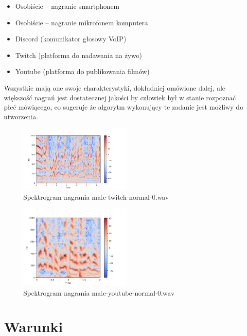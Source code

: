 \documentclass[a4paper,12pt]{extarticle}
\begin{document}
\begin{itemize}
    \item Osobiście – nagranie smartphonem
    \item Osobiście – nagranie mikrofonem komputera
    \item Discord (komunikator głosowy VoIP)
    \item Twitch (platforma do nadawania na żywo)
    \item Youtube (platforma do publikowania filmów)
\end{itemize}

Wszystkie mają one swoje charakterystyki, dokładniej omówione dalej, ale większość nagrań jest dostatecznej jakości by człowiek był w stanie rozpoznać płeć mówiącego, co sugeruje że algorytm wykonujący te zadanie jest możliwy do utworzenia.

\begin{figure}[ht]
\centering
\includegraphics[width=0.5\textwidth]{2_male-twitch-normal-0.png}
\caption{ Spektrogram nagrania male-twitch-normal-0.wav}
\end{figure}

\begin{figure}[ht]
\centering
\includegraphics[width=0.5\textwidth]{2_male-youtube-normal-0.png}
\caption{ Spektrogram nagrania male-youtube-normal-0.wav}
\end{figure}

\newpage

\section*{Warunki}
\end{document}
